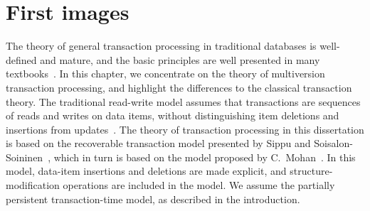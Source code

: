 \chapter{First images}
\label{chapter:dummy-layout-text}


The theory of general transaction processing in traditional 
databases is well-defined and mature, and the basic principles are
well presented in many
textbooks~\cite{bernstein:1987:cc-n-r,gray:1993:transactionprocessing,papadimitriou:1986:cc-theory}.
In this chapter, we concentrate on the theory of multiversion
transaction processing, and highlight the differences to the classical
transaction theory.
The traditional read-write model assumes that transactions are sequences
of reads and writes on data items, without distinguishing item deletions and
insertions from
updates~\cite{bernstein:1987:cc-n-r,papadimitriou:1986:cc-theory}.
The theory of transaction processing in this dissertation is based on
the recoverable transaction model presented by Sippu and
Soisalon-Soininen~\cite{sippu:2001:theory}, which in turn is based on the
model proposed by C.~Mohan~\cite{mohan:1990:aries-kvl,mohan:1992:aries-im}.
In this model, data-item insertions and deletions are made explicit,
and structure-modification operations are included in the model.
We assume the partially persistent transaction-time model, as
described in the introduction.

\begin{figure}[htb]
\centering

\label{fig:tx-snapshot}
\end{figure}

\begin{figure}[htb]
\centering

\label{fig:tx-valid}
\end{figure}

\begin{figure}[htb]
\begin{center}
\label{fig:sv-mv-index-comparison}
\end{center}
\end{figure}


